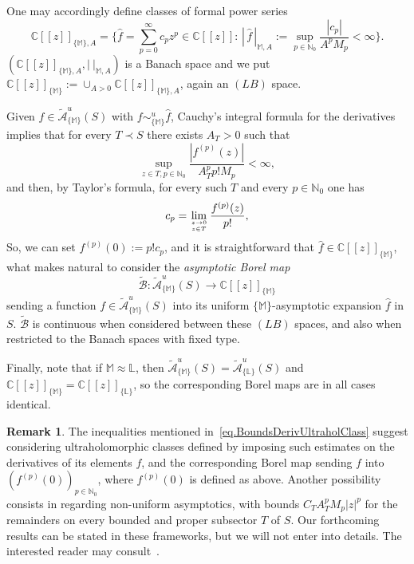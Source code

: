 \documentclass[12pt,leqno]{amsart}
\def\C{\mathbb{C}}
\def\N{\mathbb{N}}
\theoremstyle{plain}
\theoremstyle{definition}
\newtheorem{rem}[theo]{Remark}
\numberwithin{equation}{section}
\def\L{\mathbb{L}}
\def\M{\mathbb{M}}
\begin{document}
One may accordingly define classes of formal power series
$$\C[[z]]_{\{\M\},A}=\Big\{\widehat{f}=\sum_{p=0}^\infty c_pz^p\in\C[[z]]:\, \left|\,\widehat{f} \,\right|_{\M,A}:=\sup_{p\in\N_{0}}\displaystyle \frac{|c_{p}|}{A^{p}M_{p}}<\infty\Big\}.$$
$(\C[[z]]_{\{\M\},A},\left| \  \right|_{\M,A})$ is a Banach space and we put $\C[[z]]_{\{\M\}}:=\cup_{A>0}\C[[z]]_{\{\M\},A}$, again an $(LB)$ space.

Given $f\in\widetilde{\mathcal{A}}^u_{\{\M\}}(S)$ with $f\sim_{\{\M\}}^u\widehat{f}$, Cauchy's integral formula for the derivatives implies that for every $T\prec S$ there exists $A_T>0$ such that
\begin{equation}\label{eq.BoundsDerivUltraholClass}
\sup_{z\in T,p\in\N_{0}}\frac{|f^{(p)}(z)|}{A_T^{p}p!M_{p}}<\infty,
\end{equation}
and then, by Taylor's formula, for every such $T$ and every $p\in\N_0$ one has
\begin{equation*}
c_p=\lim_{ \genfrac{}{}{0pt}{}{z\to0}{z\in T}} \frac{f^{(p)}(z)}{p!},
\end{equation*}
So, we can set ${f^{(p)}(0)}:=p!c_p$, and it is straightforward that $\widehat{f}\in\C[[z]]_{\{\M\}}$, what makes natural to consider the \textit{asymptotic Borel map}
$$
\widetilde{\mathcal{B}}:\widetilde{\mathcal{A}}^u_{\{\M\}}(S)\longrightarrow \C[[z]]_{\{\M\}}$$
sending a function $f\in\widetilde{\mathcal{A}}^u_{\{\M\}}(S)$ into its uniform $\{\M\}$-asymptotic expansion $\widehat{f}$ in $S$. 
$\widetilde{\mathcal{B}}$ is continuous when considered between these  $(LB)$ spaces, and also when restricted to the Banach spaces with fixed type.



Finally, note that if $\M\approx\L$, then $\widetilde{\mathcal{A}}^u_{\{\M\}}(S)=\widetilde{\mathcal{A}}^u_{\{\L\}}(S)$ and $\C[[z]]_{\{\M\}}=\C[[z]]_{\{\L\}}$, so the corresponding Borel maps are in all cases identical.


\begin{rem}
The inequalities mentioned in~\eqref{eq.BoundsDerivUltraholClass} suggest considering ultraholomorphic classes defined by imposing such estimates on the derivatives of its elements $f$, and the corresponding Borel map sending $f$ into $(f^{(p)}(0))_{p\in\N_0}$, where $f^{(p)}(0)$ is defined as above. Another possibility consists in regarding non-uniform asymptotics, with bounds $C_TA_T^pM_p|z|^p$ for the remainders on every bounded and proper subsector $T$ of $S$. Our forthcoming results can be stated in these frameworks, but we will not enter into details. The interested reader may consult~\cite{JimenezSanzSchindlInjectSurject,JimenezSanzSchindlSurjectDc}.
\end{rem}
\end{document}
